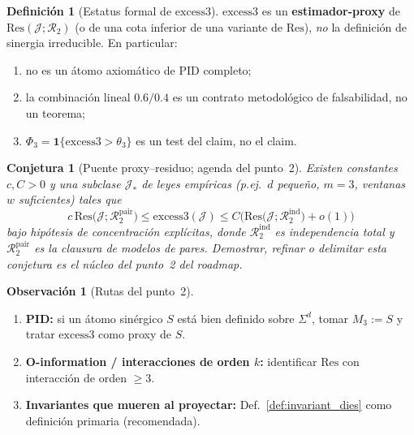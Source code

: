 \documentclass[11pt,a4paper]{article}
\theoremstyle{definition}
\newtheorem{definition}{Definici\'on}[section]
\newtheorem{remark}{Observaci\'on}[section]
\theoremstyle{plain}
\newtheorem{conjecture}{Conjetura}[section]
\theoremstyle{remark}
\newcommand{\Res}{\mathrm{Res}}
\newcommand{\excess}{\mathrm{excess3}}
\newcommand{\Rtwo}{\mathcal{R}_2}
\newcommand{\Jwin}{\mathcal{J}}
\begin{document}
\begin{definition}[Estatus formal de $\excess$]
\label{def:excess_status}
$\excess$ es un \textbf{estimador-proxy} de $\Res(\Jwin;\Rtwo)$ (o de
una cota inferior de una variante de $\Res$), \emph{no} la definici\'on
de sinergia irreducible. En particular:
\begin{enumerate}[label=(\roman*)]
  \item no es un \'atomo axiom\'atico de PID completo;
  \item la combinaci\'on lineal $0.6/0.4$ es un contrato metodol\'ogico
  de falsabilidad, no un teorema;
  \item $\Phi_3=\mathbf{1}\{\excess>\theta_3\}$ es un test del claim,
  no el claim.
\end{enumerate}
\end{definition}

\begin{conjecture}[Puente proxy--residuo; agenda del punto~2]
\label{conj:bridge}
Existen constantes $c,C>0$ y una subclase $\mathcal{J}_\ast$ de leyes
emp\'iricas (p.ej.\ $d$ peque\~no, $m=3$, ventanas $w$ suficientes) tales
que
\begin{equation}
c\,\Res\bigl(\Jwin;\Rtwo^{\mathrm{pair}}\bigr)
\le \excess(\Jwin)
\le C\bigl(\Res\bigl(\Jwin;\Rtwo^{\mathrm{ind}}\bigr)+o(1)\bigr)
\end{equation}
bajo hip\'otesis de concentraci\'on expl\'icitas, donde
$\Rtwo^{\mathrm{ind}}$ es independencia total y $\Rtwo^{\mathrm{pair}}$
es la clausura de modelos de pares. Demostrar, refinar o delimitar esta
conjetura es el n\'ucleo del punto~2 del roadmap.
\end{conjecture}

\begin{remark}[Rutas del punto~2]
\begin{enumerate}[label=(\alph*)]
  \item \textbf{PID:} si un \'atomo sin\'ergico $S$ est\'a bien definido
  sobre $\Sigma^d$, tomar $M_3:=S$ y tratar $\excess$ como proxy de $S$.
  \item \textbf{O-information / interacciones de orden $k$:}
  identificar $\Res$ con interacci\'on de orden $\ge 3$.
  \item \textbf{Invariantes que mueren al proyectar:}
  Def.~\ref{def:invariant_dies} como definici\'on primaria (recomendada).
\end{enumerate}
\end{remark}

\end{document}
